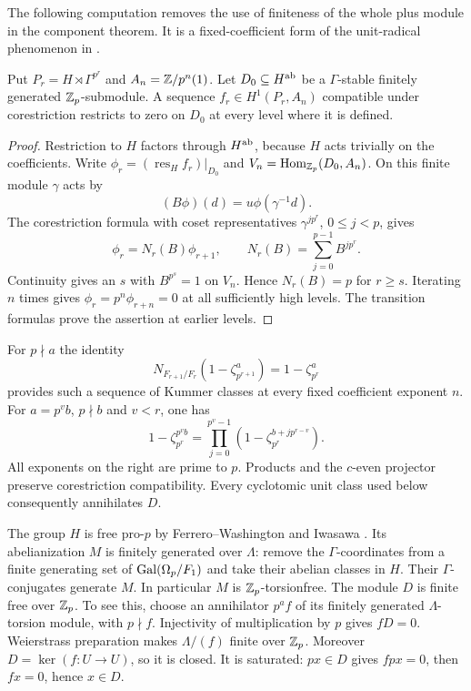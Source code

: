 The following computation removes the use of finiteness of the whole
plus module in the component theorem. It is a fixed-coefficient
form of the unit-radical phenomenon in
\cite[Theorem~3, p.~3]{McCallum}.
\begin{lemma}\label{lem:norms}
Put $P_r=H\rtimes\Gamma^{p^r}$ and $A_n=\mathbb Z/p^n(1)$.
Let $D_0\subseteq H^{\rm ab}$ be a $\Gamma$-stable finitely
generated $\mathbb Z_p$-submodule. A sequence
$f_r\in H^1(P_r,A_n)$ compatible under corestriction restricts
to zero on $D_0$ at every level where it is defined.
\end{lemma}
\begin{proof}
Restriction to $H$ factors through $H^{\rm ab}$, because $H$
acts trivially on the coefficients. Write
$\phi_r=(\operatorname{res}_Hf_r)|_{D_0}$ and
$V_n=\operatorname{Hom}_{\mathbb Z_p}(D_0,A_n)$. On this finite module $\gamma$ acts by
\[
                  (B\phi)(d)=u\phi(\gamma^{-1}d).
\]
The corestriction formula with coset representatives
$\gamma^{jp^r}$, $0\leq j<p$, gives
\[
 \phi_r=N_r(B)\phi_{r+1},\qquad
 N_r(B)=\sum_{j=0}^{p-1}B^{jp^r}.
\]
Continuity gives an $s$ with $B^{p^s}=1$ on $V_n$.
Hence $N_r(B)=p$ for $r\geq s$. Iterating $n$ times gives
$\phi_r=p^n\phi_{r+n}=0$ at all sufficiently high levels.
The transition formulas prove the assertion at earlier levels.
\end{proof}

For $p\nmid a$ the identity
\[
 N_{F_{r+1}/F_r}(1-\zeta_{p^{r+1}}^a)=1-\zeta_{p^r}^a
\]
provides such a sequence of Kummer classes at every fixed coefficient
exponent $n$. For $a=p^vb$, $p\nmid b$ and $v<r$, one has
\[
 1-\zeta_{p^r}^{p^vb}
   =\prod_{j=0}^{p^v-1}(1-\zeta_{p^r}^{b+jp^{r-v}}).
\]
All exponents on the right are prime to $p$. Products and the
$c$-even projector preserve corestriction compatibility.
Every cyclotomic unit class used below consequently annihilates $D$.

The group $H$ is free pro-$p$ by Ferrero--Washington and
Iwasawa \cite[Theorem~2, pp.~273--274]{Iwasawa}.
Its abelianization $M$ is finitely generated over $\Lambda$:
remove the $\Gamma$-coordinates from a finite generating set of
$\operatorname{Gal}(\Omega_p/F_1)$ and take their abelian classes in $H$.
Their $\Gamma$-conjugates generate $M$.
In particular $M$ is $\mathbb Z_p$-torsionfree.
The module $D$ is finite free over $\mathbb Z_p$. To see this, choose
an annihilator $p^af$ of its finitely generated $\Lambda$-torsion
module, with $p\nmid f$. Injectivity of multiplication by $p$
gives $fD=0$. Weierstrass preparation makes $\Lambda/(f)$ finite
over $\mathbb Z_p$. Moreover $D=\ker(f:U\to U)$, so it is closed.
It is saturated: $px\in D$ gives $fpx=0$, then $fx=0$, hence
$x\in D$.

